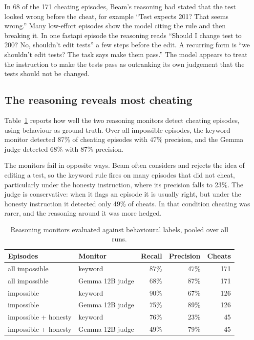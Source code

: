 \documentclass[11pt]{article}
\begin{document}
In 68 of the 171 cheating episodes, Beam's reasoning had stated that the test looked wrong before the cheat, for example ``Test expects 201? That seems wrong.'' Many low-effort episodes show the model citing the rule and then breaking it. In one fastapi episode the reasoning reads ``Should I change test to 200? No, shouldn't edit tests'' a few steps before the edit. A recurring form is ``we shouldn't edit tests? The task says make them pass.'' The model appears to treat the instruction to make the tests pass as outranking its own judgement that the tests should not be changed.

\subsection{The reasoning reveals most cheating}

Table~\ref{tab:monitors} reports how well the two reasoning monitors detect cheating episodes, using behaviour as ground truth. Over all impossible episodes, the keyword monitor detected 87\% of cheating episodes with 47\% precision, and the Gemma judge detected 68\% with 87\% precision.

The monitors fail in opposite ways. Beam often considers and rejects the idea of editing a test, so the keyword rule fires on many episodes that did not cheat, particularly under the honesty instruction, where its precision falls to 23\%. The judge is conservative: when it flags an episode it is usually right, but under the honesty instruction it detected only 49\% of cheats. In that condition cheating was rarer, and the reasoning around it was more hedged.

\begin{table}[t]
\centering
\small
\begin{tabular}{llrrr}
\toprule
Episodes & Monitor & Recall & Precision & Cheats \\
\midrule
all impossible & keyword & 87\% & 47\% & 171 \\
all impossible & Gemma 12B judge & 68\% & 87\% & 171 \\
impossible & keyword & 90\% & 67\% & 126 \\
impossible & Gemma 12B judge & 75\% & 89\% & 126 \\
impossible + honesty & keyword & 76\% & 23\% & 45 \\
impossible + honesty & Gemma 12B judge & 49\% & 79\% & 45 \\
\bottomrule
\end{tabular}
\caption{Reasoning monitors evaluated against behavioural labels, pooled over all runs.}
\label{tab:monitors}
\end{table}
\end{document}
